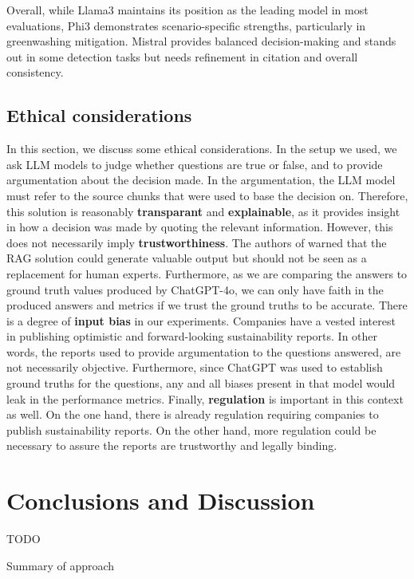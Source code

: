 \documentclass[]{article}
\begin{document}
Overall, while Llama3 maintains its position as the leading model in most evaluations, Phi3 demonstrates scenario-specific strengths, particularly in greenwashing mitigation. 
Mistral provides balanced decision-making and stands out in some detection tasks but needs refinement in citation and overall consistency.  

\subsection{Ethical considerations}

In this section, we discuss some ethical considerations.
In the setup we used, we ask LLM models to judge whether questions are true or false, and to provide argumentation about the decision made.
In the argumentation, the LLM model must refer to the source chunks that were used to base the decision on.
Therefore, this solution is reasonably \textbf{transparant} and \textbf{explainable}, as it provides insight in how a decision was made by quoting the relevant information.
However, this does not necessarily imply \textbf{trustworthiness}.
The authors of \cite{durability} warned that the RAG solution could generate valuable output but should not be seen as a replacement for human experts.
Furthermore, as we are comparing the answers to ground truth values produced by ChatGPT-4o, we can only have faith in the produced answers and metrics if we trust the ground truths to be accurate.
There is a degree of \textbf{input bias} in our experiments.
Companies have a vested interest in publishing optimistic and forward-looking sustainability reports.
In other words, the reports used to provide argumentation to the questions answered, are not necessarily objective.
Furthermore, since ChatGPT was used to establish ground truths for the questions, any and all biases present in that model would leak in the performance metrics.
Finally, \textbf{regulation} is important in this context as well.
On the one hand, there is already regulation requiring companies to publish sustainability reports.
On the other hand, more regulation could be necessary to assure the reports are trustworthy and legally binding.

\section{Conclusions and Discussion} \label{sec:conclusions}

TODO

Summary of approach
\end{document}
